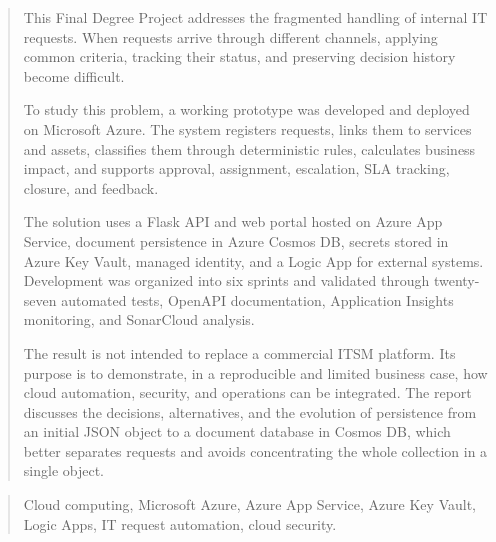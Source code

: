 \documentclass[a4paper,12pt,oneside]{memoir}
\begin{document}
\renewcommand*\abstractname{Abstract}
\begin{abstract}
This Final Degree Project addresses the fragmented handling of internal IT requests. When requests arrive through different channels, applying common criteria, tracking their status, and preserving decision history become difficult.

To study this problem, a working prototype was developed and deployed on Microsoft Azure. The system registers requests, links them to services and assets, classifies them through deterministic rules, calculates business impact, and supports approval, assignment, escalation, SLA tracking, closure, and feedback.

The solution uses a Flask API and web portal hosted on Azure App Service, document persistence in Azure Cosmos DB, secrets stored in Azure Key Vault, managed identity, and a Logic App for external systems. Development was organized into six sprints and validated through twenty-seven automated tests, OpenAPI documentation, Application Insights monitoring, and SonarCloud analysis.

The result is not intended to replace a commercial ITSM platform. Its purpose is to demonstrate, in a reproducible and limited business case, how cloud automation, security, and operations can be integrated. The report discusses the decisions, alternatives, and the evolution of persistence from an initial JSON object to a document database in Cosmos DB, which better separates requests and avoids concentrating the whole collection in a single object.
\end{abstract}

\renewcommand*\abstractname{Keywords}
\begin{abstract}
Cloud computing, Microsoft Azure, Azure App Service, Azure Key Vault, Logic Apps, IT request automation, cloud security.
\end{abstract}

\clearpage

\tableofcontents

\clearpage

\listoffigures

\clearpage

\listoftables
\clearpage

\mainmatter











\end{document}
